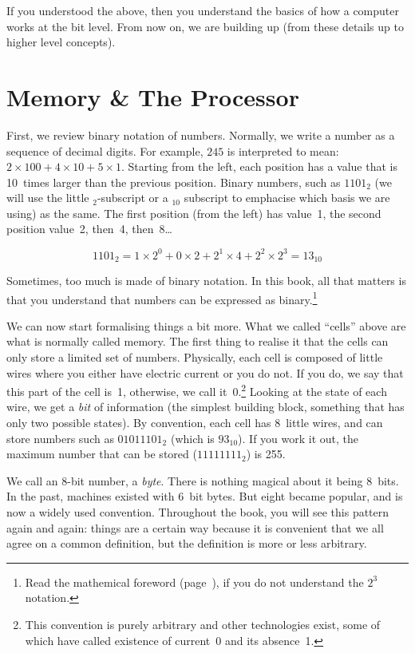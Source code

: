 If you understood the above, then you understand the basics of how a computer
works at the bit level. From now on, we are building up (from these details up
to higher level concepts).

\section{Memory \& The Processor}

First, we review binary notation of numbers. Normally, we write a number as a
sequence of decimal digits. For example, $245$ is interpreted to mean: $2
\times 100 + 4 \times 10 + 5 \times 1$. Starting from the left, each position
has a value that is 10~times larger than the previous position. Binary numbers,
such as $1101_2$ (we will use the little $_2$-subscript or a $_{10}$ subscript
to emphacise which basis we are using) as the same. The first position (from
the left) has value~1, the second position value~2, then~4, then~8\ldots

\[
1101_2 = 1 \times 2^{0}  + 0 \times 2 + 2^1 \times 4 + 2^2 \times 2^3 = 13_{10}
\]

Sometimes, too much is made of binary notation. In this book, all that matters
is that you understand that numbers can be expressed as binary.\footnote{Read
the mathemical foreword (page~\pageref{chpt:mathforeword}), if you do not
understand the $2^3$ notation.}

We can now start formalising things a bit more. What we called ``cells'' above
are what is normally called memory. The first thing to realise it that the
cells can only store a limited set of numbers. Physically, each cell is
composed of little wires where you either have electric current or you do not.
If you do, we say that this part of the cell is~1, otherwise, we call
it~0.\footnote{This convention is purely arbitrary and other technologies
exist, some of which have called existence of current~0 and its absence~1.}
Looking at the state of each wire, we get a \emph{bit} of information (the
simplest building block, something that has only two possible states). By
convention, each cell has 8~little wires, and can store numbers such as
$01011101_2$ (which is $93_{10}$). If you work it out, the maximum number that
can be stored ($11111111_2$) is 255.

We call an 8-bit number, a \emph{byte}. There is nothing magical about it being
8~bits. In the past, machines existed with 6~bit bytes. But eight became
popular, and is now a widely used convention. Throughout the book, you will see
this pattern again and again: things are a certain way because it is convenient
that we all agree on a common definition, but the definition is more or less
arbitrary.

